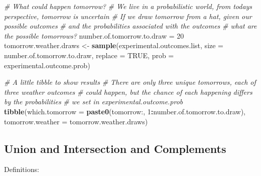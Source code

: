 \documentclass[
]{book}
\newenvironment{Shaded}{\begin{snugshade}}{\end{snugshade}}
\newcommand{\CommentTok}[1]{\textcolor[rgb]{0.56,0.35,0.01}{\textit{#1}}}
\newcommand{\DataTypeTok}[1]{\textcolor[rgb]{0.13,0.29,0.53}{#1}}
\newcommand{\DecValTok}[1]{\textcolor[rgb]{0.00,0.00,0.81}{#1}}
\newcommand{\KeywordTok}[1]{\textcolor[rgb]{0.13,0.29,0.53}{\textbf{#1}}}
\newcommand{\NormalTok}[1]{#1}
\newcommand{\OperatorTok}[1]{\textcolor[rgb]{0.81,0.36,0.00}{\textbf{#1}}}
\newcommand{\OtherTok}[1]{\textcolor[rgb]{0.56,0.35,0.01}{#1}}
\newcommand{\StringTok}[1]{\textcolor[rgb]{0.31,0.60,0.02}{#1}}
\begin{document}
\begin{Shaded}
\begin{Highlighting}[]
\CommentTok{\# What could happen tomorrow?}
\CommentTok{\# We live in a probabilistic world, from today\textquotesingle{}s perspective, tomorrow is uncertain}
\CommentTok{\# If we draw tomorrow from a hat, given our possible outcomes}
\CommentTok{\# and the probabilities associated with the outcomes}
\CommentTok{\# what are the possible tomorrows?}
\NormalTok{number.of.tomorrow.to.draw =}\StringTok{ }\DecValTok{20}
\NormalTok{tomorrow.weather.draws \textless{}{-}}\StringTok{ }\KeywordTok{sample}\NormalTok{(experimental.outcomes.list,}
                                 \DataTypeTok{size =}\NormalTok{ number.of.tomorrow.to.draw,}
                                 \DataTypeTok{replace =} \OtherTok{TRUE}\NormalTok{,}
                                 \DataTypeTok{prob =}\NormalTok{ experimental.outcome.prob)}

\CommentTok{\# A little tibble to show results}
\CommentTok{\# There are only three unique tomorrows, each of three weather outcomes}
\CommentTok{\# could happen, but the chance of each happening differs by the probabilities}
\CommentTok{\# we set in experimental.outcome.prob}
\KeywordTok{tibble}\NormalTok{(}\DataTypeTok{which.tomorrow =} \KeywordTok{paste0}\NormalTok{(}\StringTok{\textquotesingle{}tomorrow:\textquotesingle{}}\NormalTok{, }\DecValTok{1}\OperatorTok{:}\NormalTok{number.of.tomorrow.to.draw),}
       \DataTypeTok{tomorrow.weather =}\NormalTok{ tomorrow.weather.draws)}
\end{Highlighting}
\end{Shaded}

\hypertarget{union-and-intersection-and-complements}{%
\subsection{Union and Intersection and Complements}\label{union-and-intersection-and-complements}}

Definitions:
\end{document}
